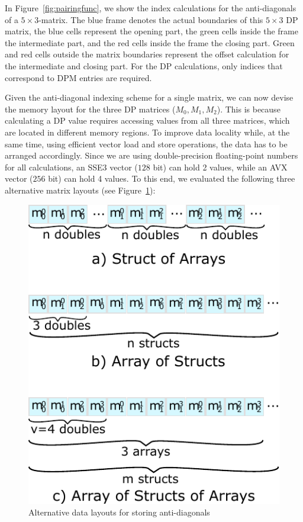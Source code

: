 \documentclass[runningheads,a4paper]{llncs}
\begin{document}
In Figure~\ref{fig:pairingfunc}, we show the index calculations for the anti-diagonals of a $5\times3$-matrix. 
The blue frame denotes the actual boundaries of this $5\times3$ DP matrix, the blue cells represent the opening part, 
the green cells inside the frame the intermediate part, and the red cells inside the frame the closing part. 
Green and red cells outside the matrix boundaries represent the offset calculation for the intermediate and closing part. 
For the DP calculations, only indices that correspond to DPM entries are required. 

Given the anti-diagonal indexing scheme for a single matrix, we can now 
devise the memory layout for the three DP matrices ($M_0,M_1,M_2$).  
This is because calculating a DP value requires 
accessing values from all three matrices, which are located in different
memory regions.  
To improve data locality while, at the same time, using efficient
vector load and store operations, 
the data has to be arranged accordingly.  Since we are using
double-precision floating-point numbers for all calculations, an SSE3 vector
($128$ bit) can hold 2 values, while an AVX vector ($256$ bit) can hold 4 values.
To this end, we evaluated the following three alternative matrix layouts (see Figure~\ref{fig:datalayout}):

\begin{figure}[ht!]
  \centering
  \includegraphics[scale=0.7]{figures/datalayout.pdf}
  \caption{Alternative data layouts for storing anti-diagonals}
  \label{fig:datalayout}
\end{figure}
\end{document}
